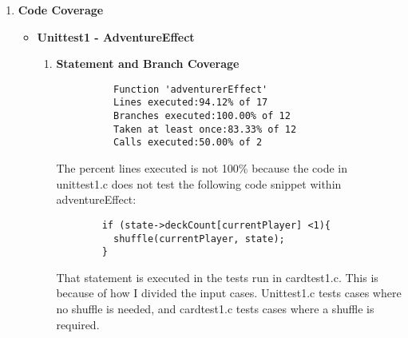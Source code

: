 \documentclass[11pt,letterpaper]{article}
\begin{document}
\begin{enumerate}[label=\Roman*.]
\begin{enumerate}
\begin{itemize}[leftmargin=*]
\begin{lstlisting}
  int k[10] = {adventurer, embargo, village, minion, mine, cutpurse, sea_hag, tribute, smithy, council_room};
  initializeGame(numPlayers, k, seed, &G);
  setHand(&G, player, handpos); // sets hand to have four coppers and Mine
  choice0 = 0;                  // will be trashing first copper
  choice1 = village;             // NOT ALLOWED
  memcpy(&testG, &G, sizeof(struct gameState)); 
  
  // TEST STARTS HERE
  result = cardEffect(mine, choice0, choice1, 0, &testG, handpos, &coin_bonus);
  if (result == -1)
    printf("\tPASSED: Function returned -1 (not allowed to trash non-treasure)\n");
  else printf("\t\u274CFAILED: Function did not return -1, so it continued unexpectedly\n");
          \end{lstlisting}
        \end{itemize}
    \end{enumerate}

  \item \textbf{Code Coverage}
    
    \begin{itemize}[leftmargin=*]
      \item \textbf{Unittest1 - AdventureEffect}
      
        \begin{enumerate}[leftmargin=*]
          \item \textbf{Statement and Branch Coverage}

          \begin{lstlisting}
          Function 'adventurerEffect'
          Lines executed:94.12% of 17
          Branches executed:100.00% of 12
          Taken at least once:83.33% of 12
          Calls executed:50.00% of 2
          \end{lstlisting}

          The percent lines executed is not 100\% because the code in unittest1.c
          does not test the following code snippet within adventureEffect:

          \begin{lstlisting}
        if (state->deckCount[currentPlayer] <1){
          shuffle(currentPlayer, state);
        }
          \end{lstlisting}

          That statement is executed in the tests run in cardtest1.c. This is because of how
            I divided the input cases. Unittest1.c tests cases where no shuffle is needed, 
            and cardtest1.c tests cases where a shuffle is required. 


\end{enumerate}
\end{itemize}
\end{enumerate}
\end{document}
